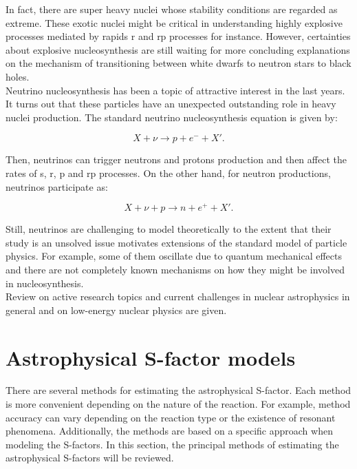 \documentclass[openany]{book}
\begin{document}
In fact, there are super heavy nuclei whose stability conditions are regarded as extreme. These exotic nuclei might be critical in understanding highly explosive processes mediated by rapids r and rp processes for instance. However, certainties about explosive nucleosynthesis are still waiting for more concluding explanations on the mechanism of transitioning between white dwarfs to neutron stars to black holes. \\ 

Neutrino nucleosynthesis has been a topic of attractive interest in the last years. It turns out that these particles have an unexpected outstanding role in heavy nuclei production. The standard neutrino nucleosynthesis equation is given by: 

\begin{equation}\label{eq:reaction_neutrino}
	X + \nu \rightarrow p + e^{-} +  X'.
\end{equation}

Then, neutrinos can trigger neutrons and protons production and then affect the rates of s, r, p and rp processes. On the other hand, for neutron productions, neutrinos participate as: 

\begin{equation}\label{eq:reaction_neutrino_2}
	X + \nu + p \rightarrow n + e^{+} +  X'.
\end{equation}

Still, neutrinos are challenging to model theoretically to the extent that their study is an unsolved issue motivates extensions of the standard model of particle physics. For example, some of them oscillate due to quantum mechanical effects and there are not completely known mechanisms on how they might be involved in nucleosynthesis. \\

Review on active research topics and current challenges in nuclear astrophysics in general \cite{arcones_bardayan_beers_bernstein_blackmon_messer_brown_brown_brune_champagne_et_2017} and on low-energy nuclear physics \cite{carlson_carpenter_casten_elster_fallon_gade_gross_hagen_hayes_higinbotham_et_2017} are given.


\chapter{Astrophysical S-factor models} \label{ch:sfactorModels}

There are several methods for estimating the astrophysical S-factor. Each method is more convenient depending on the nature of the reaction. For example, method accuracy can vary depending on  the reaction type or the existence of resonant phenomena. Additionally, the methods are based on a specific approach when modeling the S-factors. In this section, the principal methods of estimating the astrophysical S-factors will be reviewed.
\end{document}
